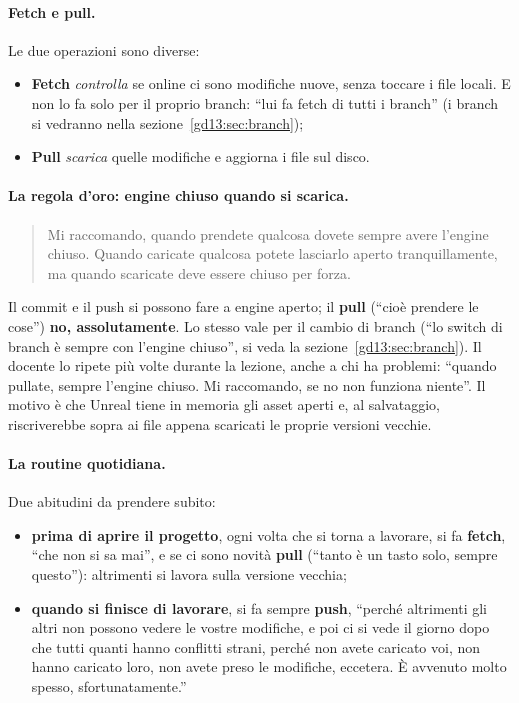 \paragraph{Fetch e pull.} Le due operazioni sono diverse:
\begin{itemize}
  \item \textbf{Fetch} \emph{controlla} se online ci sono modifiche nuove, senza
        toccare i file locali. E non lo fa solo per il proprio branch: ``lui fa
        fetch di tutti i branch'' (i branch si vedranno nella
        sezione~\ref{gd13:sec:branch});
  \item \textbf{Pull} \emph{scarica} quelle modifiche e aggiorna i file sul
        disco.
\end{itemize}

\paragraph{La regola d'oro: engine chiuso quando si scarica.}
\begin{quote}
Mi raccomando, quando prendete qualcosa dovete sempre avere l'engine chiuso.
Quando caricate qualcosa potete lasciarlo aperto tranquillamente, ma quando
scaricate deve essere chiuso per forza.
\end{quote}
Il commit e il push si possono fare a engine aperto; il \textbf{pull} (``cioè
prendere le cose'') \textbf{no, assolutamente}. Lo stesso vale per il cambio di
branch (``lo switch di branch è sempre con l'engine chiuso'', si veda la
sezione~\ref{gd13:sec:branch}). Il docente lo ripete più volte durante la
lezione, anche a chi ha problemi: ``quando pullate, sempre l'engine chiuso. Mi
raccomando, se no non funziona niente''. Il motivo è che Unreal tiene in memoria
gli asset aperti e, al salvataggio, riscriverebbe sopra ai file appena scaricati
le proprie versioni vecchie.

\paragraph{La routine quotidiana.} Due abitudini da prendere subito:
\begin{itemize}
  \item \textbf{prima di aprire il progetto}, ogni volta che si torna a
        lavorare, si fa \textbf{fetch}, ``che non si sa mai'', e se ci sono
        novità \textbf{pull} (``tanto è un tasto solo, sempre questo''):
        altrimenti si lavora sulla versione vecchia;
  \item \textbf{quando si finisce di lavorare}, si fa sempre \textbf{push},
        ``perché altrimenti gli altri non possono vedere le vostre modifiche, e
        poi ci si vede il giorno dopo che tutti quanti hanno conflitti strani,
        perché non avete caricato voi, non hanno caricato loro, non avete preso
        le modifiche, eccetera. È avvenuto molto spesso, sfortunatamente.''
\end{itemize}

